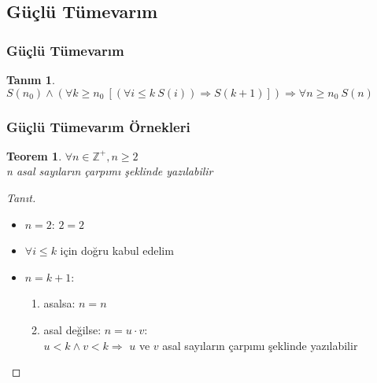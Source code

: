 \documentclass[dvipsnames]{beamer}
\theoremstyle{definition}
\newtheorem{tanim}[theorem]{Tanım}
\theoremstyle{example}
\theoremstyle{plain}
\newtheorem{teorem}[theorem]{Teorem}
\begin{document}
\subsection{Güçlü Tümevarım}

\begin{frame}
  \frametitle{Güçlü Tümevarım}

  \begin{tanim}
    $S(n_0) \wedge
      (\forall k \geq n_0~[(\forall i \leq k~S(i)) \Rightarrow S(k+1)])
      \Rightarrow \forall n \geq n_0~S(n)$
  \end{tanim}
\end{frame}

\begin{frame}
  \frametitle{Güçlü Tümevarım Örnekleri}

  \begin{teorem}
    $\forall n \in \mathbb{Z}^+, n \geq 2$\\
      n asal sayıların çarpımı şeklinde yazılabilir
  \end{teorem}

  \pause
  \begin{proof}[Tanıt]
    \begin{itemize}
      \item $n=2$: $2=2$

      \pause
      \item $\forall i \leq k$ için doğru kabul edelim

      \pause
      \item $n=k+1$:
      \begin{enumerate}
        \item asalsa: $n=n$

        \pause
        \item asal değilse: $n=u \cdot v$:\\
          $u < k \wedge v < k \Rightarrow$ $u$ ve $v$ asal sayıların çarpımı
          şeklinde yazılabilir
      \end{enumerate}
    \end{itemize}
  \end{proof}
\end{frame}
\end{document}
